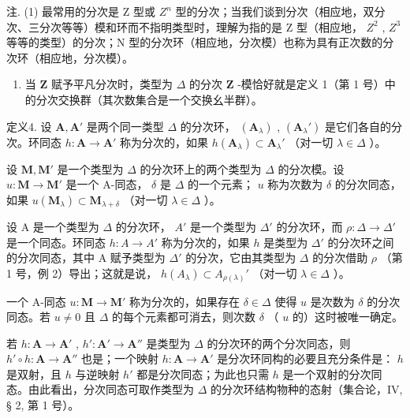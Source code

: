 注. (1) 最常用的分次是 Z 型或 \(Z^{n}\) 型的分次；当我们谈到分次（相应地，双分次、三分次等等）模和环而不指明类型时，理解为指的是 Z 型（相应地， \(Z^{2}\) , \(Z^{3}\) 等等的类型）的分次；N 型的分次环（相应地，分次模）也称为具有正次数的分次环（相应地，分次模）。

\begin{enumerate}
\def\labelenumi{(\arabic{enumi})}
\setcounter{enumi}{1}
\tightlist
\item
  当 \(\mathbf{Z}\) 赋予平凡分次时，类型为 \(\Delta\) 的分次 \(\mathbf{Z}\) -模恰好就是定义 1（第 1 号）中的分次交换群（其次数集合是一个交换幺半群）。
\end{enumerate}

定义4. 设 \(\mathbf{A}, \mathbf{A}'\) 是两个同一类型 \(\Delta\) 的分次环， \((\mathbf{A}_{\lambda})\) , \((\mathbf{A}_{\lambda}')\) 是它们各自的分次。环同态 \(h: \mathbf{A} \to \mathbf{A}'\) 称为分次的，如果 \(h(\mathbf{A}_{\lambda}) \subset \mathbf{A}_{\lambda}'\) （对一切 \(\lambda \in \Delta\) ）。

设 \(\mathbf{M}, \mathbf{M}'\) 是一个类型为 \(\Delta\) 的分次环上的两个类型为 \(\Delta\) 的分次模。设 \(u: \mathbf{M} \to \mathbf{M}'\) 是一个 A-同态， \(\delta\) 是 \(\Delta\) 的一个元素； \(u\) 称为次数为 \(\delta\) 的分次同态，如果 \(u(\mathbf{M}_{\lambda}) \subset \mathbf{M}_{\lambda + \delta}\) （对一切 \(\lambda \in \Delta\) ）。

设 A 是一个类型为 \(\Delta\) 的分次环， \(A'\) 是一个类型为 \(\Delta'\) 的分次环，而 \(\rho: \Delta \to \Delta'\) 是一个同态。环同态 \(h: A \to A'\) 称为分次的，如果 \(h\) 是类型为 \(\Delta'\) 的分次环之间的分次同态，其中 A 赋予类型为 \(\Delta'\) 的分次，它由其类型为 \(\Delta\) 的分次借助 \(\rho\) （第 1 号，例 2）导出；这就是说， \(h(A_{\lambda}) \subset A_{\rho(\lambda)}'\) （对一切 \(\lambda \in \Delta\) ）。

一个 A-同态 \(u: \mathbf{M} \to \mathbf{M}'\) 称为分次的，如果存在 \(\delta \in \Delta\) 使得 \(u\) 是次数为 \(\delta\) 的分次同态。若 \(u \neq 0\) 且 \(\Delta\) 的每个元素都可消去，则次数 \(\delta\) （ \(u\) 的）这时被唯一确定。

若 \(h: \mathbf{A} \to \mathbf{A}'\) , \(h': \mathbf{A}' \to \mathbf{A}''\) 是类型为 \(\Delta\) 的分次环的两个分次同态，则 \(h' \circ h: \mathbf{A} \to \mathbf{A}''\) 也是；一个映射 \(h: \mathbf{A} \to \mathbf{A}'\) 是分次环同构的必要且充分条件是： \(h\) 是双射，且 \(h\) 与逆映射 \(h'\) 都是分次同态；为此也只需 \(h\) 是一个双射的分次同态。由此看出，分次同态可取作类型为 \(\Delta\) 的分次环结构物种的态射（集合论，IV, § 2, 第 1 号）。

